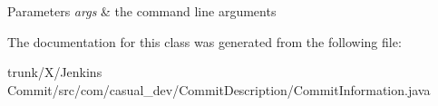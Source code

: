\begin{DoxyParams}{Parameters}
{\em args} & the command line arguments \\
\hline
\end{DoxyParams}


The documentation for this class was generated from the following file\-:\begin{DoxyCompactItemize}
\item 
trunk/\-X/\-Jenkins Commit/src/com/casual\-\_\-dev/\-Commit\-Description/Commit\-Information.\-java\end{DoxyCompactItemize}
